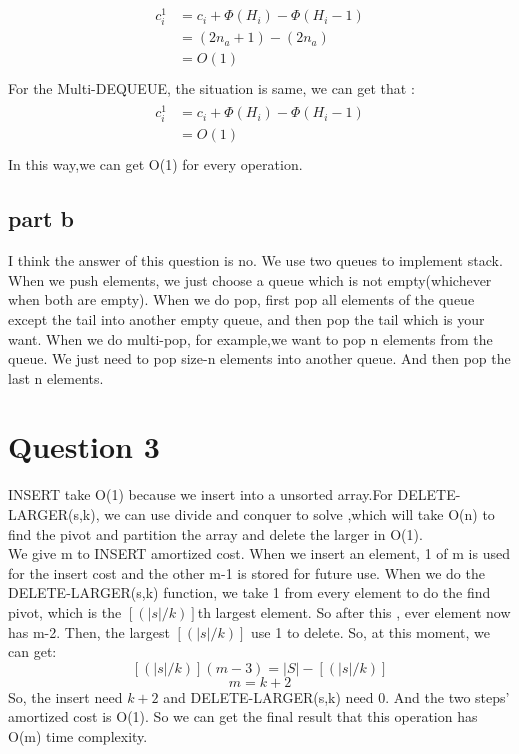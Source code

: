 \documentclass[paper=a4, fontsize=11pt]{scrartcl} %
\numberwithin{equation}{section} %
\numberwithin{figure}{section} %
\numberwithin{table}{section} %
\begin{document}
\begin{align*}
\begin{split}
c_i^1 &=c_i+\Phi(H_i)-\Phi(H_i-1)\\
      &=(2n_a+1)-(2n_a)\\
      &=O(1)\\
\end{split}
\end{align*}
For the Multi-DEQUEUE, the situation is same, we can get that :\\
\begin{align*}
\begin{split}
c_i^1 &=c_i+\Phi(H_i)-\Phi(H_i-1)\\
      &=O(1)\\
\end{split}
\end{align*}
In this way,we can get O(1) for every operation.

\subsection{\textbf{part b}}
I think the answer of this question is no.
We use two queues to implement stack. When we push elements, we just choose a queue which is not empty(whichever when both are empty). When we do pop, first pop all elements of the queue except the tail into another empty queue, and then pop the tail which is your want. When we do multi-pop, for example,we want to pop n elements from the queue. We just need to pop size-n elements into another queue. And then pop the last n elements.


\vspace{2cm}
\section{\textbf{Question 3}}
INSERT take O(1) because we insert into a unsorted array.For DELETE-LARGER(s,k), we can use divide and conquer to solve ,which will take O(n) to find the pivot and partition the array and delete the larger in O(1). \\
We give m to INSERT amortized cost. When we insert an element, 1 of m is used for the insert cost and the other m-1 is stored for future use. When we do the DELETE-LARGER(s,k) function, we take 1 from every element to do the find pivot, which is the $[(|s|/k)]$th largest element. So after this , ever element now has m-2. Then, the largest  $[(|s|/k)]$ use 1 to delete. So, at this moment, we can get:\\
$$[(|s|/k)](m-3)=|S|-[(|s|/k)]$$
$$m=k+2$$
So, the insert need $k+2$ and DELETE-LARGER(s,k) need 0. And the two steps' amortized cost is O(1). So we can get the final result that this operation has O(m) time complexity.  
\end{document}
